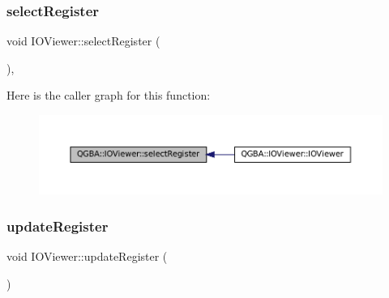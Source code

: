 \subsubsection{\texorpdfstring{select\+Register}{selectRegister}\hspace{0.1cm}{\footnotesize\ttfamily [2/2]}}
{\footnotesize\ttfamily void I\+O\+Viewer\+::select\+Register (\begin{DoxyParamCaption}{ }\end{DoxyParamCaption})\hspace{0.3cm}{\ttfamily [private]}, {\ttfamily [slot]}}

Here is the caller graph for this function\+:
\nopagebreak
\begin{figure}[H]
\begin{center}
\leavevmode
\includegraphics[width=350pt]{class_q_g_b_a_1_1_i_o_viewer_a57f7fdec26467658e8bb78628fff66dc_icgraph}
\end{center}
\end{figure}
\mbox{\label{class_q_g_b_a_1_1_i_o_viewer_a2e75eb25e921d6cecdda851ea81eaf48}} 
\subsubsection{\texorpdfstring{update\+Register}{updateRegister}}
{\footnotesize\ttfamily void I\+O\+Viewer\+::update\+Register (\begin{DoxyParamCaption}{ }\end{DoxyParamCaption})\hspace{0.3cm}{\ttfamily [slot]}}

